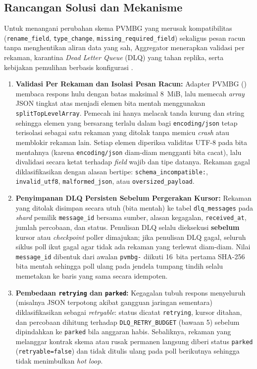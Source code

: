 \subsection{Rancangan Solusi dan Mekanisme}
Untuk menangani perubahan skema PVMBG yang merusak kompatibilitas (\texttt{rename\_field}, \texttt{type\_change}, \texttt{missing\_required\_field}) sekaligus pesan racun tanpa menghentikan aliran data yang sah, Aggregator menerapkan validasi per rekaman, karantina \textit{Dead Letter Queue} (DLQ) yang tahan replika, serta kebijakan pemulihan berbasis konfigurasi \cite{kleppmann2017designing,hohpe2003enterprise}.

\begin{enumerate}
    \item \textbf{Validasi Per Rekaman dan Isolasi Pesan Racun:} Adapter PVMBG () membaca respons hulu dengan batas maksimal 8~MiB, lalu memecah \textit{array} JSON tingkat atas menjadi elemen bita mentah menggunakan \texttt{splitTopLevelArray}. Pemecah ini hanya melacak tanda kurung dan string sehingga elemen yang bersarang terlalu dalam bagi \texttt{encoding/json} tetap terisolasi sebagai satu rekaman yang ditolak tanpa memicu \textit{crash} atau memblokir rekaman lain. Setiap elemen diperiksa validitas UTF-8 pada bita mentahnya (karena \texttt{encoding/json} diam-diam mengganti bita cacat), lalu divalidasi secara ketat terhadap \textit{field} wajib dan tipe datanya. Rekaman gagal diklasifikasikan dengan alasan bertipe: \texttt{schema\_incompatible:}, \texttt{invalid\_utf8}, \texttt{malformed\_json}, atau \texttt{oversized\_payload}.
    \item \textbf{Penyimpanan DLQ Persisten Sebelum Pergerakan Kursor:} Rekaman yang ditolak disimpan secara utuh (bita mentah) ke tabel \texttt{dlq\_messages} pada \textit{shard} pemilik \texttt{message\_id} bersama sumber, alasan kegagalan, \texttt{received\_at}, jumlah percobaan, dan status. Penulisan DLQ selalu dieksekusi \textbf{sebelum} kursor atau \textit{checkpoint} poller dimajukan; jika penulisan DLQ gagal, seluruh siklus poll ikut gagal agar tidak ada rekaman yang terlewat diam-diam. Nilai \texttt{message\_id} dibentuk dari awalan \texttt{pvmbg-} diikuti 16~bita pertama SHA-256 bita mentah sehingga poll ulang pada jendela tumpang tindih selalu memetakan ke baris yang sama secara idempoten.
    \item \textbf{Pembedaan \texttt{retrying} dan \texttt{parked}:} Kegagalan tubuh respons menyeluruh (misalnya JSON terpotong akibat gangguan jaringan sementara) diklasifikasikan sebagai \textit{retryable}: status dicatat \texttt{retrying}, kursor ditahan, dan percobaan dihitung terhadap \texttt{DLQ\_RETRY\_BUDGET} (bawaan 5) sebelum dipindahkan ke \texttt{parked} bila anggaran habis. Sebaliknya, rekaman yang melanggar kontrak skema atau rusak permanen langsung diberi status \texttt{parked} (\texttt{retryable=false}) dan tidak ditulis ulang pada poll berikutnya sehingga tidak menimbulkan \textit{hot loop}.

\end{enumerate}
